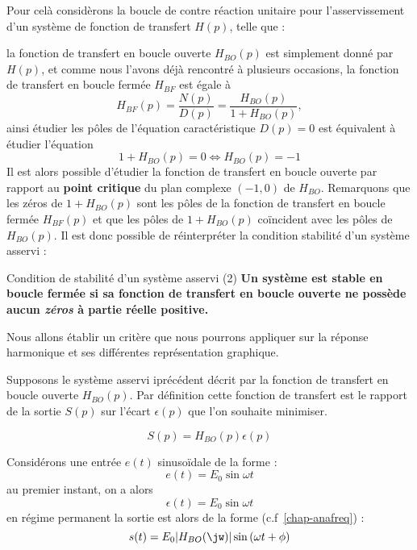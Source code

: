 Pour celà considèrons la boucle de contre réaction unitaire 
pour l'asservissement d'un système de fonction de transfert $H(p)$, telle que : 
\begin{center}
\end{center}

la fonction de transfert en boucle ouverte $H_{BO}(p)$ est simplement donné par $H(p)$, et comme nous l'avons 
déjà rencontré à plusieurs occasions, la fonction de transfert en boucle fermée $H_{BF}$ est égale à 
$$
H_{BF}(p)=\dfrac{N(p)}{D(p)}=\dfrac{H_{BO}(p)}{1+H_{BO}(p)},
$$
ainsi étudier les pôles de l'équation caractéristique $D(p)=0$ est équivalent à étudier l'équation 
$$
1+H_{BO}(p)=0\Leftrightarrow H_{BO}(p)=-1
$$
Il est alors possible d'étudier la fonction de transfert en boucle ouverte par rapport au \textbf{point critique}
du plan complexe $(-1,0)$ de $H_{BO}$.
Remarquons que les zéros de $1+H_{BO}(p)$ sont les pôles de la fonction de transfert en boucle fermée $H_{BF}(p)$ et
que les pôles de $1+H_{BO}(p)$ co\"incident avec les pôles de $H_{BO}(p)$.
Il est donc possible de réinterpréter la condition stabilité d'un système asservi :

\begin{criteria}{Condition de stabilité d'un système asservi (2)}
    \textbf{Un système est stable en boucle fermée si sa fonction de transfert en boucle ouverte ne possède aucun 
    \emph{zéros} à partie réelle positive.}
\end{criteria}

Nous allons établir un critère que nous pourrons appliquer sur la réponse harmonique et 
ses différentes représentation graphique.

Supposons le système asservi iprécédent décrit 
par la fonction de transfert en boucle ouverte $H_{BO}(p)$. Par définition cette fonction 
de transfert est le rapport de la sortie $S(p)$ sur l'écart $\epsilon(p)$ que l'on souhaite minimiser.

$$
S(p)=H_{BO}(p)\epsilon(p)
$$

Considérons une entrée $e(t)$ sinuso\"idale de la forme :
$$
e(t)=E_0\sin{\omega t}
$$
au premier instant, on a alors 
$$
\epsilon(t)=E_0\sin{\omega t}
$$
en régime permanent la sortie est alors de la forme (c.f~\cref{chap-anafreq}) :
$$
s(t)=E_0|H_{BO}(\jw)|\sin{(\omega t+\phi)}
$$

